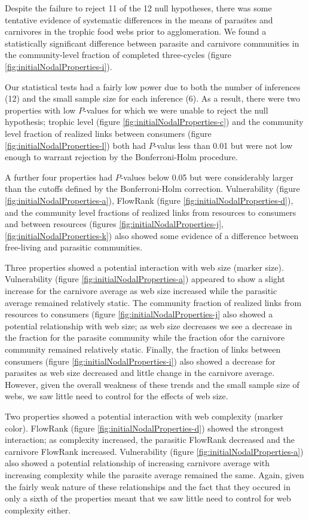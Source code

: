 \documentclass[../dissertation.tex]{subfiles}
\begin{document}
Despite the failure to reject 11 of the 12 null hypotheses, there was some
tentative evidence of systematic differences in the means of parasites and
carnivores in the trophic food webs prior to agglomeration. We found a
statistically significant difference between parasite and carnivore communities
in the community-level fraction of completed three-cycles (figure
\ref{fig:initialNodalProperties-i}).

Our statistical tests had a fairly low power due to both the number of
inferences (12) and the small sample size for each inference (6). As a result,
there were two properties with low $P$-values for which we were unable to
reject the null hypothesis; trophic level (figure
\ref{fig:initialNodalProperties-c}) and the community level fraction of realized
links between consumers (figure \ref{fig:initialNodalProperties-l}) both had
$P$-valus less than 0.01 but were not low enough to warrant rejection by the
Bonferroni-Holm procedure.  

A further four properties had $P$-values below 0.05 but were considerably
larger than the cutoffs defined by the Bonferroni-Holm correction.
Vulnerability (figure \ref{fig:initialNodalProperties-a}), FlowRank (figure
\ref{fig:initialNodalProperties-d}), and the community level fractions of
realized links from resources to consumers and between resources (figures
\ref{fig:initialNodalProperties-j}, \ref{fig:initialNodalProperties-k}) also showed
some evidence of a difference between free-living and parasitic communities. 

Three properties showed a potential interaction with web size (marker size).
Vulnerability (figure \ref{fig:initialNodalProperties-a}) appeared to show a
slight increase for the carnivore average as web size increased while the
parasitic average remained relatively static. The community fraction of
realized links from resources to consumers (figure
\ref{fig:initialNodalProperties-j} also showed a potential relationship with
web size; as web size decreases we see a decrease in the fraction for the
parasite community while the fraction ofor the carnivore community remained
relatively static.  Finally, the fraction of links between consumers (figure
\ref{fig:initialNodalProperties-i}) also showed a decrease for parasites as web
size decreased and little change in the carnivore average.  However, given the
overall weakness of these trends and the small sample size of webs, we saw
little need to control for the effects of web size.

Two properties showed a potential interaction with web complexity (marker
color). FlowRank (figure \ref{fig:initialNodalProperties-d}) showed the
strongest interaction; as complexity increased, the parasitic FlowRank
decreased and the carnivore FlowRank increased. Vulnerability (figure
\ref{fig:initialNodalProperties-a}) also showed a potential relationship of
increasing carnivore average with increasing complexity while the parasite
average remained the same. Again, given the fairly weak nature of these
relationships and the fact that they occured in only a sixth of the properties
meant that we saw little need to control for web complexity either.
\end{document}
